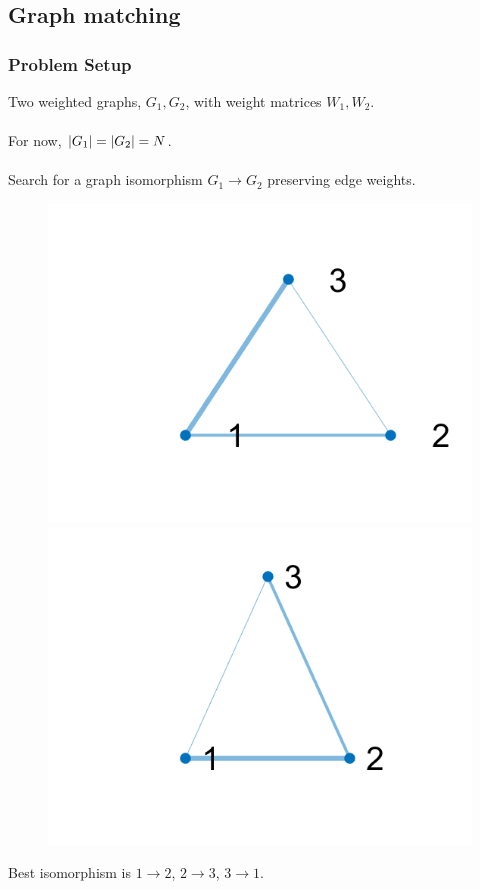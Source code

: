 \documentclass{beamer}
\begin{document}
\subsection{Graph matching}
\begin{frame}
  \frametitle{Problem Setup}
  Two weighted graphs, $G_1,G_2$, with weight matrices $W_1,W_2$.\\~\\
  For now, $\left\lvert G_1\right\rvert = \left\lvert G_2\right\rvert = N$.\\~\\
  Search for a graph isomorphism $G_1\to G_2$ preserving edge weights.
  \begin{figure}[ht]
    \centering
    \begin{minipage}[b]{0.40\linewidth}
      \centering
      \includegraphics[width=\textwidth]{./Images/GraphMatch/isom1.png}
    \end{minipage}
    \begin{minipage}[b]{0.40\linewidth}
      \centering
      \includegraphics[width=\textwidth]{./Images/GraphMatch/isom2.png}
    \end{minipage}
  \end{figure}
  Best isomorphism is $1 \to 2$, $2 \to 3$, $3 \to 1$.
\end{frame}
\end{document}
